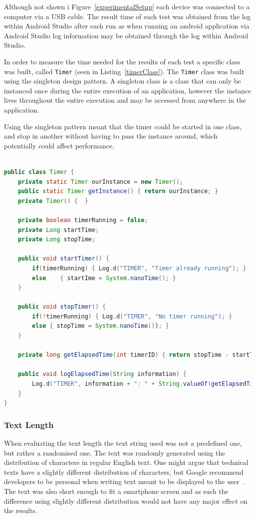 Although not shown i Figure~\ref{experimentalSetup} each device was connected to a computer via a USB cable. The  result time of each test was obtained from the log within Android Studio after each run as when running an android application via Android Studio log information may be obtained through the log within Android Studio.

In order to measure the time needed for the results of each test a specific class was built, called \texttt{Timer} (seen in Listing~\ref{timerClass}). The \texttt{Timer} class was built using the singleton design pattern. A singleton class is a class that can only be instanced once during the entire execution of an application, however the instance lives throughout the entire execution and may be accessed from anywhere in the application.

Using the singleton pattern meant that the timer could be started in one class, and stop in another without having to pass the instance around, which potentially could affect performance.

\begin{lstlisting}[language=Java, caption={The Timer class}, label=timerClass]

public class Timer {
	private static Timer ourInstance = new Timer();
	public static Timer getInstance() { return ourInstance; }
	private Timer() {  }
	
	private boolean timerRunning = false;
	private Long startTime;
	private Long stopTime;
	
	public void startTimer() { 
		if(timerRunning) { Log.d("TIMER", "Timer already running"); }
		else 	{ startIme = System.nanoTime(); }
	}
	
	public void stopTimer() {
		if(!timerRunning) { Log.d("TIMER", "No timer running"); }
		else { stopTime = System.nanoTime()); }
	}
	
	private long getElapsedTime(int timerID) { return stopTime - startTime; }
	
	public void logElapsedTime(String information) {
		Log.d("TIMER", information + ": " + String.valueOf(getElapsedTime() + " nano seconds");
	}
}
\end{lstlisting}

\subsubsection{Text Length}
When evaluating the text length the text string used was not a predefined one, but rather a randomised one. The text was randomly generated using the distribution of characters in regular English text. One might argue that technical texts have a slightly different distribution of characters, but Google recommend developers to be personal when writing text meant to be displayed to the user~\cite{glassDesignStyle}. The text was also short enough to fit a smartphone screen and as such the difference using slightly different distribution would not have any major effect on the results.

